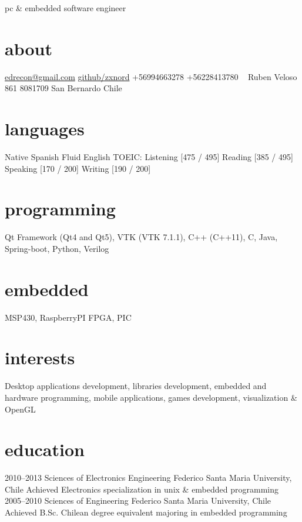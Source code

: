 \documentclass[]{friggeri-cv}
\begin{document}
       {pc \& embedded software engineer}


\begin{aside}
  \section{about}
    \href{mailto:edrecon@gmail.com}{edrecon@gmail.com}
    \href{https://github.com/zxnord}{github/zxnord}
    +56994663278
    +56228413780
    ~
    Ruben Veloso 861
    8081709
    San Bernardo
    Chile
  \section{languages}
    Native Spanish
    Fluid English
    TOEIC:
    Listening [475 / 495]
    Reading [385 / 495]
    Speaking [170 / 200]
    Writing [190 / 200]
  \section{programming}
    Qt Framework
    (Qt4 and Qt5), VTK
    (VTK 7.1.1), C++
    (C++11), C, Java,
    Spring-boot, Python,
    Verilog
  \section{embedded}
    MSP430, RaspberryPI
    FPGA, PIC
\end{aside}

\section{interests}

Desktop applications development, libraries development, embedded and hardware programming,
mobile applications, games development, visualization \& OpenGL

\section{education}

\begin{entrylist}
  \entry
    {2010–2013}
    {Sciences of Electronics Engineering}
    {Federico Santa Maria University, Chile}
    {Achieved Electronics specialization in unix \& embedded programming}
  \entry
    {2005–2010}
    {Sciences of Engineering}
    {Federico Santa Maria University, Chile}
    {Achieved B.Sc. Chilean degree equivalent majoring in embedded programming
}
\end{entrylist}
\end{document}
